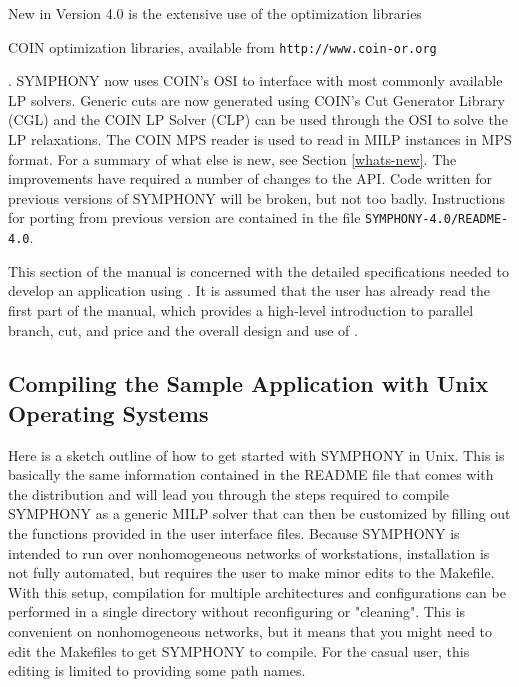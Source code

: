 New in Version 4.0 is the extensive use of the
\emph{}
optimization libraries 
\begin{latexonly} 
COIN optimization libraries,
available from \texttt{http://www.coin-or.org} 
\end{latexonly}.
SYMPHONY now uses COIN's OSI to interface with most commonly available LP
solvers. Generic cuts are now generated using COIN's Cut Generator Library
(CGL) and the COIN LP Solver (CLP) can be used through the OSI to solve the LP
relaxations. The COIN MPS reader is used to read in MILP instances in MPS
format. For a summary of what else is new, see Section \ref{whats-new}. The
improvements have required a number of changes to the API. Code written for
previous versions of SYMPHONY will be broken, but not too badly. Instructions
for porting from previous version are contained in the file
\texttt{SYMPHONY-4.0/README-4.0}.

This section of the manual is concerned with the detailed
specifications needed to develop an application using \BB. It is
assumed that the user has already read the first part of the manual, which
provides a high-level introduction to parallel branch, cut, and price
and the overall design and use of \BB. 


\subsection{Compiling the Sample Application with Unix Operating Systems}
\label{getting_started_unix}

Here is a sketch outline of how to get started with SYMPHONY in Unix. This is
basically the same information contained in the README file that comes with
the distribution and will lead you through the steps required to compile
SYMPHONY as a generic MILP solver that can then be customized by filling out
the functions provided in the user interface files. Because SYMPHONY is
intended to run over nonhomogeneous networks of workstations, installation is
not fully automated, but requires the user to make minor edits to the
Makefile.  With this setup, compilation for multiple architectures and
configurations can be performed in a single directory without reconfiguring or
"cleaning". This is convenient on nonhomogeneous networks, but it means that
you might need to edit the Makefiles to get SYMPHONY to compile. For the casual
user, this editing is limited to providing some path names.

